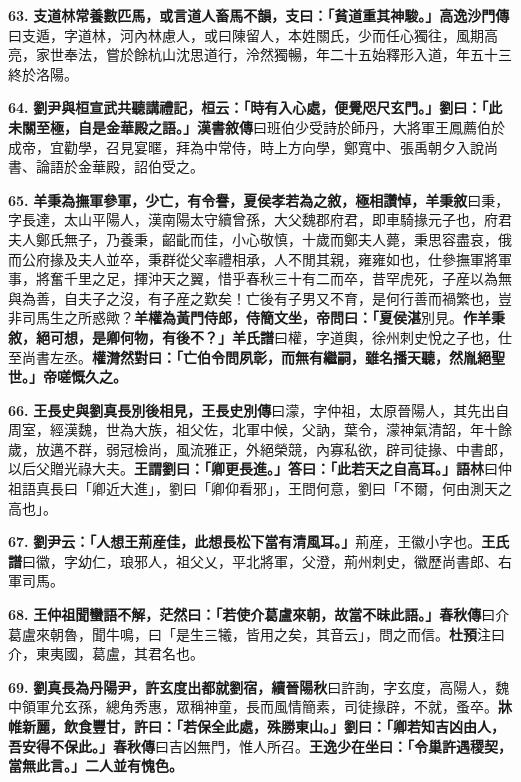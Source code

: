 \textbf{63.} \textbf{支道林常養數匹馬，或言道人畜馬不韻，支曰：「貧道重其神駿。」}{\footnotesize \textbf{高逸沙門傳}曰支遁，字道林，河內林慮人，或曰陳留人，本姓關氏，少而任心獨往，風期高亮，家世奉法，嘗於餘杭山沈思道行，泠然獨暢，年二十五始釋形入道，年五十三終於洛陽。}

\textbf{64.} \textbf{劉尹與桓宣武共聽講禮記，桓云：「時有入心處，便覺咫尺玄門。」劉曰：「此未關至極，自是金華殿之語。」}{\footnotesize \textbf{漢書敘傳}曰班伯少受詩於師丹，大將軍王鳳薦伯於成帝，宜勸學，召見宴暱，拜為中常侍，時上方向學，鄭寬中、張禹朝夕入說尚書、論語於金華殿，詔伯受之。}

\textbf{65.} \textbf{羊秉為撫軍參軍，少亡，有令譽，夏侯孝若為之敘，極相讚悼，}{\footnotesize \textbf{羊秉敘}曰秉，字長達，太山平陽人，漢南陽太守續曾孫，大父魏郡府君，即車騎掾元子也，府君夫人鄭氏無子，乃養秉，齠齔而佳，小心敬慎，十歲而鄭夫人薨，秉思容盡哀，俄而公府掾及夫人並卒，秉群從父率禮相承，人不閒其親，雍雍如也，仕參撫軍將軍事，將奮千里之足，揮沖天之翼，惜乎春秋三十有二而卒，昔罕虎死，子産以為無與為善，自夫子之沒，有子産之歎矣！亡後有子男又不育，是何行善而禍繁也，豈非司馬生之所惑歟？}\textbf{羊權為黃門侍郎，侍簡文坐，帝問曰：「夏侯湛}{\footnotesize 別見。}\textbf{作羊秉敘，絕可想，是卿何物，有後不？」}{\footnotesize \textbf{羊氏譜}曰權，字道輿，徐州刺史悅之子也，仕至尚書左丞。}\textbf{權潸然對曰：「亡伯令問夙彰，而無有繼嗣，雖名播天聽，然胤絕聖世。」帝嗟慨久之。}

\textbf{66.} \textbf{王長史與劉真長別後相見，}{\footnotesize \textbf{王長史別傳}曰濛，字仲祖，太原晉陽人，其先出自周室，經漢魏，世為大族，祖父佐，北軍中候，父訥，葉令，濛神氣清韶，年十餘歲，放邁不群，弱冠檢尚，風流雅正，外絕榮競，內寡私欲，辟司徒掾、中書郎，以后父贈光祿大夫。}\textbf{王謂劉曰：「卿更長進。」答曰：「此若天之自高耳。」}{\footnotesize \textbf{語林}曰仲祖語真長曰「卿近大進」，劉曰「卿仰看邪」，王問何意，劉曰「不爾，何由測天之高也」。}

\textbf{67.} \textbf{劉尹云：「人想王荊産佳，此想長松下當有清風耳。」}{\footnotesize 荊産，王徽小字也。\textbf{王氏譜}曰徽，字幼仁，琅邪人，祖父乂，平北將軍，父澄，荊州刺史，徽歷尚書郎、右軍司馬。}

\textbf{68.} \textbf{王仲祖聞蠻語不解，茫然曰：「若使介葛盧來朝，故當不昧此語。」}{\footnotesize \textbf{春秋傳}曰介葛盧來朝魯，聞牛鳴，曰「是生三犧，皆用之矣，其音云」，問之而信。\textbf{杜預}注曰介，東夷國，葛盧，其君名也。}

\textbf{69.} \textbf{劉真長為丹陽尹，許玄度出都就劉宿，}{\footnotesize \textbf{續晉陽秋}曰許詢，字玄度，高陽人，魏中領軍允玄孫，總角秀惠，眾稱神童，長而風情簡素，司徒掾辟，不就，蚤卒。}\textbf{牀帷新麗，飲食豐甘，許曰：「若保全此處，殊勝東山。」劉曰：「卿若知吉凶由人，吾安得不保此。」}{\footnotesize \textbf{春秋傳}曰吉凶無門，惟人所召。}\textbf{王逸少在坐曰：「令巢許遇稷契，當無此言。」二人並有愧色。}

